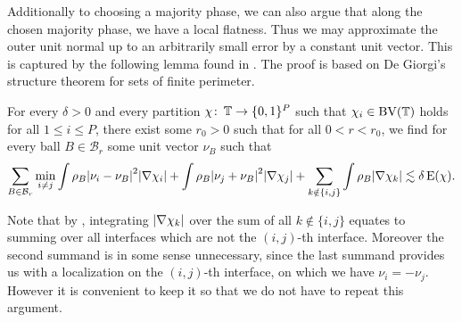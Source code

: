 Additionally to choosing a majority phase, we can also argue that along the 
chosen majority phase, we have a local flatness. Thus we may approximate the 
outer unit normal up to an arbitrarily small error by a constant unit vector. 
This is captured by the following lemma found in 
\cite{laux_otto_convergence_of_thresholding_scheme_for_mmcf}. The proof is 
based on De Giorgi's structure theorem for sets of finite perimeter.

\begin{lemma}
	\label{localization_lemma_with_normals}
	For every $ \delta > 0 $ and every partition $ \chi \colon \operatorname{\mathbb{T}} \to 
	\{ 0 , 1 \}^{ P } $ such that $ \chi_{ i } \in \operatorname{BV} ( \operatorname{\mathbb{T}} ) $ holds 
	for all $ 1 \leq i \leq P $, there exist some $ r_{ 0 } > 0 $ such that for 
	all $ 0 < r < r_{ 0 } $, we find for every ball $ B \in \mathcal{B}_{ r } $ 
	some unit vector $ \nu_{ B } $ such that
	\begin{equation*}
		\sum_{ B \in \mathcal{B}_{ r } }
		\min_{ i \neq j }
		\int
		\rho_{ B }
		\abs{ \nu_{ i } - \nu_{ B } }^{ 2 }
		\abs{ \nabla \chi_{ i } }
		+
		\int
		\rho_{ B }
		\abs{ \nu_{ j } + \nu_{ B } }^{ 2 }
		\abs{ \nabla \chi_{ j } }
		+
		\sum_{ k \notin \{ i , j \} }
		\int 
		\rho_{ B }
		\abs{ \nabla \chi_{ k } }
		\lesssim
		\delta \operatorname{E} ( \chi ).
	\end{equation*}
\end{lemma}

Note that by , integrating  $ 
\abs{ \nabla \chi_{ k } } $ over the sum of all $ k \notin \{ i , j \} $ 
equates to summing over all interfaces which are not the $ (i,j)$-th interface. 
Moreover the second summand is in some sense unnecessary, since the last 
summand provides us with a localization on the $ (i,j)$-th interface, on which 
we have $ \nu_{ i } = - \nu_{ j } $.
However it is convenient to keep it so that we do not have to repeat this 
argument.

